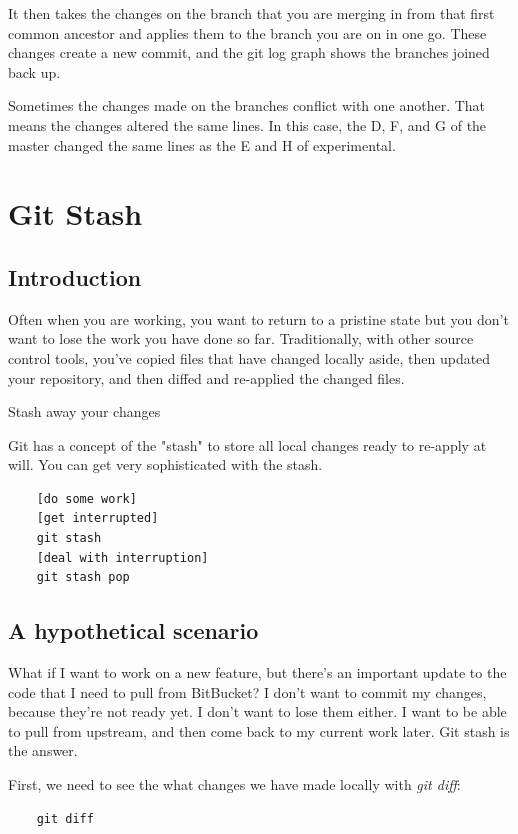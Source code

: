 \documentclass{report}
\begin{document}
It then takes the changes on the branch that you are merging in from that first common ancestor and applies them to the branch you are on in one go. These changes create a new commit, and the git log graph shows the branches joined back up.

Sometimes the changes made on the branches conflict with one another. That means the changes altered the same lines. In this case, the D, F, and G of the master changed the same lines as the E and H of experimental.

\chapter{Git Stash}

\section{Introduction}

Often when you are working, you want to return to a pristine state but you don't want to lose the work you have done so far. Traditionally, with other source control tools, you've copied files that have changed locally aside, then updated your repository, and then diffed and re-applied the changed files.

Stash away your changes

Git has a concept of the "stash" to store all local changes ready to re-apply at will. You can get very sophisticated with the stash.

\begin{lstlisting}
    [do some work]
    [get interrupted]
    git stash
    [deal with interruption]
    git stash pop
\end{lstlisting}

\section{A hypothetical scenario}

What if I want to work on a new feature, but there's an important update to the code that I need to pull from BitBucket? I don't want to commit my changes, because they're not ready yet. I don't want to lose them either. I want to be able to pull from upstream, and then come back to my current work later. Git stash is the answer.

First, we need to see the what changes we have made locally with \textit{git diff}:

\begin{lstlisting}
    git diff
\end{lstlisting}
\end{document}
